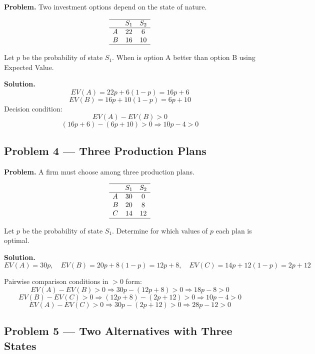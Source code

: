 \begin{ExamProblems}
		\textbf{Problem.}
		Two investment options depend on the state of nature.
		
		\[
		\begin{array}{lcc}
		\hline
		 & S_1 & S_2 \\
		\hline
		A & 22 & 6 \\
		B & 16 & 10 \\
		\hline
		\end{array}
		\]
		
		Let \(p\) be the probability of state \(S_1\).  
		When is option A better than option B using Expected Value.
		
		\textbf{Solution.}
		\[
		EV(A)=22p+6(1-p)=16p+6
		\]
		\[
		EV(B)=16p+10(1-p)=6p+10
		\]
		Decision condition:
		\[
		EV(A)-EV(B)>0
		\]
		\[
		(16p+6)-(6p+10)>0 \Rightarrow 10p-4>0
		\]
		
		\hypertarget{c7-ex4}{}
		\item
		\subsection*{Problem 4 — Three Production Plans}
		
		\textbf{Problem.}
		A firm must choose among three production plans.
		
		\[
		\begin{array}{lcc}
		\hline
		 & S_1 & S_2 \\
		\hline
		A & 30 & 0 \\
		B & 20 & 8 \\
		C & 14 & 12 \\
		\hline
		\end{array}
		\]
		
		Let \(p\) be the probability of state \(S_1\).  
		Determine for which values of \(p\) each plan is optimal.
		
		\textbf{Solution.}
		\[
		EV(A)=30p,\quad
		EV(B)=20p+8(1-p)=12p+8,\quad
		EV(C)=14p+12(1-p)=2p+12
		\]
		
		Pairwise comparison conditions in \(>0\) form:
		\[
		EV(A)-EV(B)>0 \Rightarrow 30p-(12p+8)>0 \Rightarrow 18p-8>0
		\]
		\[
		EV(B)-EV(C)>0 \Rightarrow (12p+8)-(2p+12)>0 \Rightarrow 10p-4>0
		\]
		\[
		EV(A)-EV(C)>0 \Rightarrow 30p-(2p+12)>0 \Rightarrow 28p-12>0
		\]
		
		\hypertarget{c7-ex5}{}
		\item
		\subsection*{Problem 5 — Two Alternatives with Three States}
		

\end{ExamProblems}

